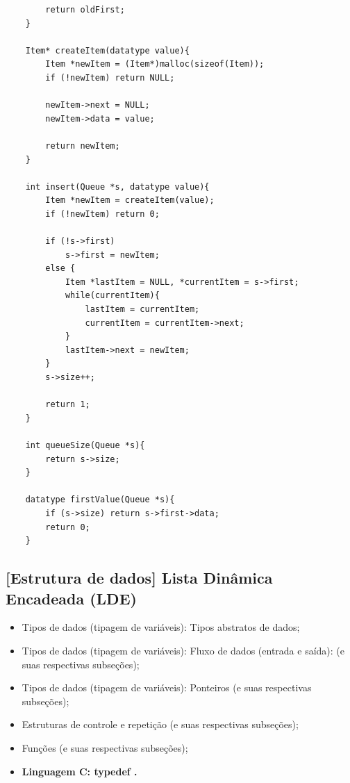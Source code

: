 \documentclass[12pt]{article}
\begin{document}
\begin{lstlisting}
    	return oldFirst;
    }
    
    Item* createItem(datatype value){
    	Item *newItem = (Item*)malloc(sizeof(Item));
    	if (!newItem) return NULL;
    	
    	newItem->next = NULL;
    	newItem->data = value;
    	
    	return newItem;
    }
    
    int insert(Queue *s, datatype value){
    	Item *newItem = createItem(value);
    	if (!newItem) return 0;
    	
    	if (!s->first)
    		s->first = newItem;
    	else {
    		Item *lastItem = NULL, *currentItem = s->first;
    		while(currentItem){
    			lastItem = currentItem;
    			currentItem = currentItem->next;
    		}
    		lastItem->next = newItem;
    	}
    	s->size++;
    	
    	return 1;
    }
    
    int queueSize(Queue *s){
    	return s->size;
    }
    
    datatype firstValue(Queue *s){
    	if (s->size) return s->first->data;
    	return 0;
    }
\end{lstlisting}

\newpage
\subsection{[Estrutura de dados] Lista Dinâmica Encadeada (LDE)}

\hspace{0.25cm}
\begin{tcolorbox}[colback=violet!5!white,colframe=violet!75!white,title=Capítulos recomendados:]
    \begin{itemize}
        \item Tipos de dados (tipagem de variáveis): Tipos abstratos de dados;
        \item Tipos de dados (tipagem de variáveis): Fluxo de dados (entrada e saída): (e suas respectivas subseções);
        \item Tipos de dados (tipagem de variáveis): Ponteiros (e suas respectivas subseções);
        \item Estruturas de controle e repetição (e suas respectivas subseções);
        \item Funções (e suas respectivas subseções);
        \item \textbf{Linguagem C: typedef \cite{site:typedef}.}
    \end{itemize}
\end{tcolorbox}
\end{document}
